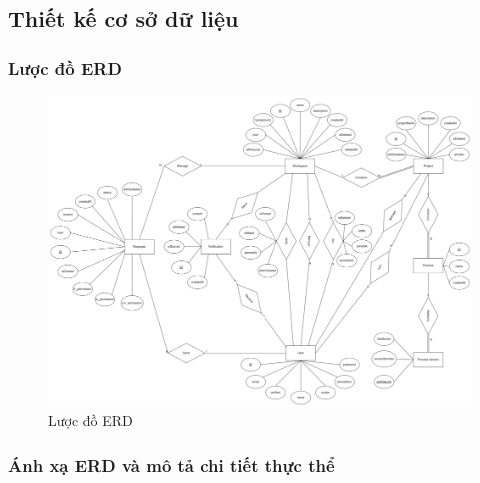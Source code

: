 \subsection{Thiết kế cơ sở dữ liệu}
\subsubsection{Lược đồ ERD}
\begin{figure}[H]
        \centering
        \includegraphics[width=\linewidth]{Content/Phân tích và thiết kế hệ thống/images/erd.png}
        \caption{Lược đồ ERD}
        \label{fig:Lược đồ ERD}
\end{figure}
\subsubsection{Ánh xạ ERD và mô tả chi tiết thực thể}
